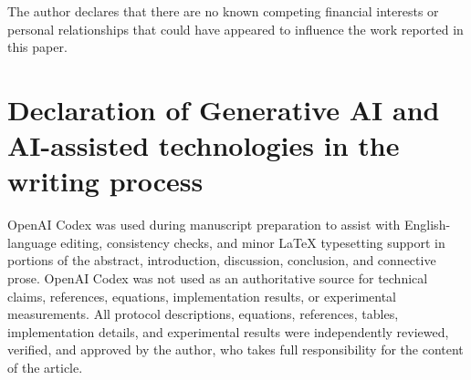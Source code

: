 \documentclass[preprint,12pt]{elsarticle}
\theoremstyle{remark}
\begin{document}
The author declares that there are no known competing financial
interests or personal relationships that could have appeared to
influence the work reported in this paper.

\section*{Declaration of Generative AI and AI-assisted technologies in the writing process}

OpenAI Codex was used during manuscript preparation to assist with
English-language editing, consistency checks, and minor LaTeX
typesetting support in portions of the abstract, introduction,
discussion, conclusion, and connective prose. OpenAI Codex was not used
as an authoritative source for technical claims, references, equations,
implementation results, or experimental measurements. All protocol
descriptions, equations, references, tables, implementation details, and
experimental results were independently reviewed, verified, and approved
by the author, who takes full responsibility for the content of the
article.
\end{document}
